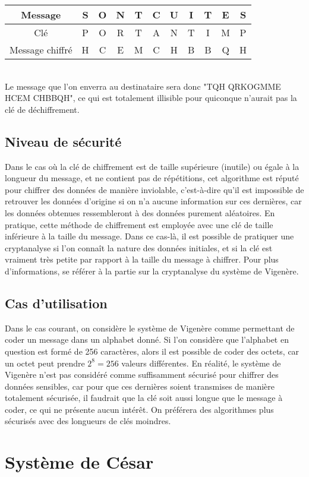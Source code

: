 			\begin{tabular}{ | c | c | c | c | c | c | c | c | c | c | c | }
				\hline
				Message & S&O&N&T&C&U&I&T&E&S \\ \hline
				Clé & P&O&R&T&A&N&T&I&M&P \\ \hline
				Message chiffré & H&C&E&M&C&H&B&B&Q&H \\
				\hline
			\end{tabular}\\
			Le message que l'on enverra au destinataire sera donc "TQH QRKOGMME HCEM CHBBQH", ce qui est totalement illisible pour quiconque n'aurait pas la clé de déchiffrement.
		\subsection{Niveau de sécurité}
			Dans le cas où la clé de chiffrement est de taille supérieure (inutile) ou égale à la longueur du message, et ne contient pas de répétitions, cet algorithme est réputé pour chiffrer des données de manière inviolable, c'est-à-dire qu'il est impossible de retrouver les données d'origine si on n'a aucune information sur ces dernières, car les données obtenues ressembleront à des données purement aléatoires. En pratique, cette méthode de chiffrement est employée avec une clé de taille inférieure à la taille du message. Dans ce cas-là, il est possible de pratiquer une cryptanalyse si l'on connaît la nature des données initiales, et si la clé est vraiment très petite par rapport à la taille du message à chiffrer. Pour plus d'informations, se référer à la partie sur la cryptanalyse du système de Vigenère.
		\subsection{Cas d'utilisation}
			Dans le cas courant, on considère le système de Vigenère comme permettant de coder un message dans un alphabet donné. Si l'on considère que l'alphabet en question est formé de 256 caractères, alors il est possible de coder des octets, car un octet peut prendre $2^8 = 256$ valeurs différentes. En réalité, le système de Vigenère n'est pas considéré comme suffisamment sécurisé pour chiffrer des données sensibles, car pour que ces dernières soient transmises de manière totalement sécurisée, il faudrait que la clé soit aussi longue que le message à coder, ce qui ne présente aucun intérêt. On préférera des algorithmes plus sécurisés avec des longueurs de clés moindres.
	\section{Système de César}

